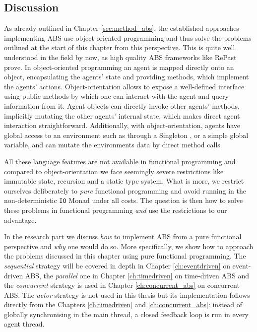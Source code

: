 \subsection{Discussion}
As already outlined in Chapter \ref{sec:method_abs}, the established approaches implementing ABS use object-oriented programming and thus solve the problems outlined at the start of this chapter from this perspective. This is quite well understood  in the field by now, as high quality ABS frameworks like RePast \cite{north_complex_2013} prove. In object-oriented programming an agent is mapped directly onto an object, encapsulating the agents' state and providing methods, which implement the agents' actions. Object-orientation allows to expose a well-defined interface using public methods by which one can interact with the agent and query information from it. Agent objects can directly invoke other agents' methods, implicitly mutating the other agents' internal state, which makes direct agent interaction straightforward. Additionally, with object-orientation, agents have global access to an environment such as through a Singleton \cite{gamma_design_1994}, or a simple global variable, and can mutate the environments data by direct method calls.

All these language features are not available in functional programming and compared to object-orientation we face seemingly severe restrictions like immutable state, recursion and a static type system. What is more, we restrict ourselves deliberately to \textit{pure} functional programming and avoid running in the non-deterministic \texttt{IO} Monad under all costs. The question is then how to solve these problems in functional programming \textit{and} use the restrictions to our advantage.

In the research part we discuss \textit{how} to implement ABS from a pure functional perspective and \textit{why} one would do so. More specifically, we show how to approach the problems discussed in this chapter using pure functional programming. The \textit{sequential} strategy will be covered in depth in Chapter \ref{ch:eventdriven} on event-driven ABS, the \textit{parallel} one in Chapter \ref{ch:timedriven} on time-driven ABS and the \textit{concurrent} strategy is used in Chapter \ref{ch:concurrent_abs} on concurrent ABS. The \textit{actor} strategy is not used in this thesis but its implementation follows directly from the Chapters \ref{ch:timedriven} and \ref{ch:concurrent_abs}: instead of globally synchronising in the main thread, a closed feedback loop is run in every agent thread.